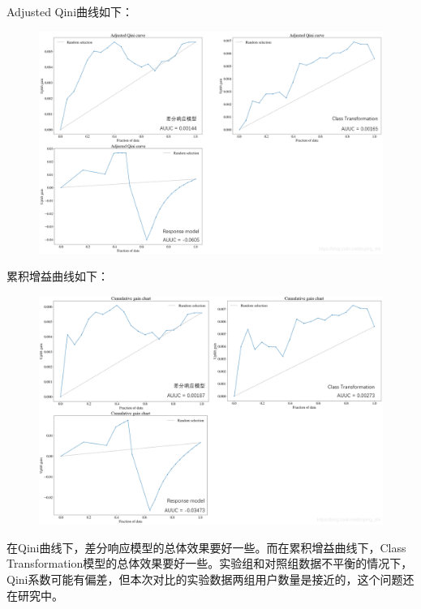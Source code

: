 \documentclass[12pt]{article}
\begin{document}
Adjusted Qini曲线如下：
\begin{figure}[H]
    \centering
    \includegraphics[width=1\textwidth]{fig/CasualInference-Uplift_Model_Demo7.png}
\end{figure}

累积增益曲线如下：
\begin{figure}[H]
    \centering
    \includegraphics[width=1\textwidth]{fig/CasualInference-Uplift_Model_Demo8.png}
\end{figure}

在Qini曲线下，差分响应模型的总体效果要好一些。而在累积增益曲线下，Class Transformation模型的总体效果要好一些。实验组和对照组数据不平衡的情况下，Qini系数可能有偏差，但本次对比的实验数据两组用户数量是接近的，这个问题还在研究中。
\end{document}
